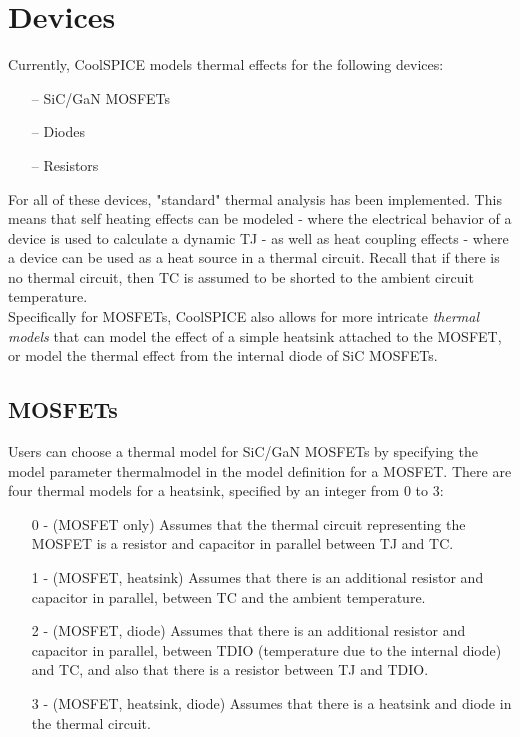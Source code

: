 \section{Devices}
\label{subsec_sceadm_thermalDevices}

Currently, CoolSPICE models thermal effects for the following devices:

\begin{itemize}
	\setlength\itemsep{0.01in}
	\item[--] SiC/GaN MOSFETs
	\item[--] Diodes
	\item[--] Resistors
\end{itemize}

For all of these devices, "standard" thermal analysis has been implemented. This means that self heating effects can be modeled - where the electrical behavior of a device is used to calculate a dynamic TJ - as well as heat coupling effects - where a device can be used as a heat source in a thermal circuit. Recall that if there is no thermal circuit, then TC is assumed to be shorted to the ambient circuit temperature. \\ 

Specifically for MOSFETs, CoolSPICE also allows for more intricate \textit{thermal models} that can model the effect of a simple heatsink attached to the MOSFET, or model the thermal effect from the internal diode of SiC MOSFETs.

\subsection{MOSFETs}
\label{subsubsec_sceadm_thermalMOSFETs}

Users can choose a thermal model for SiC/GaN MOSFETs by specifying the model parameter {\selectfont thermalmodel} in the model definition for a MOSFET. There are four thermal models for a heatsink, specified by an integer from 0 to 3:

\begin{itemize}
	\item[0]- (MOSFET only) Assumes that the thermal circuit representing the MOSFET is a resistor and capacitor in parallel between TJ and TC.
	\item[1]- (MOSFET, heatsink) Assumes that there is an additional resistor and capacitor in parallel, between TC and the ambient temperature.
	\item[2]- (MOSFET, diode) Assumes that there is an additional resistor and capacitor in parallel, between TDIO (temperature due to the internal diode) and TC, and also that there is a resistor between TJ and TDIO.
	\item[3]- (MOSFET, heatsink, diode) Assumes that there is a heatsink and diode in the thermal circuit.
\end{itemize}


